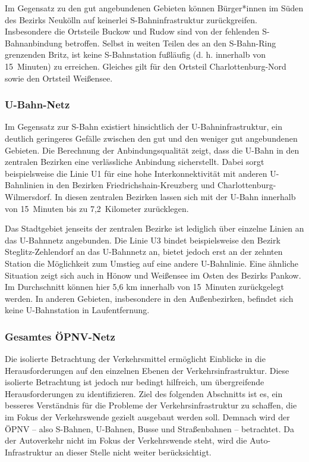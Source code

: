 
Im Gegensatz zu den gut angebundenen Gebieten können Bürger*innen im Süden des Bezirks Neukölln auf keinerlei S-Bahninfrastruktur zurückgreifen. Insbesondere die Ortsteile Buckow und Rudow sind von der fehlenden S-Bahnanbindung betroffen. Selbst in weiten Teilen des an den S-Bahn-Ring grenzenden Britz, ist keine S-Bahnstation fußläufig (d. h. innerhalb von 15~Minuten) zu erreichen. Gleiches gilt für den Ortsteil Charlottenburg-Nord sowie den Ortsteil Weißensee.

\subsubsection{U-Bahn-Netz}

Im Gegensatz zur S-Bahn existiert hinsichtlich der U-Bahninfrastruktur, ein deutlich geringeres Gefälle zwischen den gut und den weniger gut angebundenen Gebieten. Die Berechnung der Anbindungsqualität zeigt, dass die U-Bahn in den zentralen Bezirken eine verlässliche Anbindung sicherstellt. Dabei sorgt beispielsweise die Linie U1 für eine hohe Interkonnektivität mit anderen U-Bahnlinien in den Bezirken Friedrichshain-Kreuzberg und Charlottenburg-Wilmersdorf. In diesen zentralen Bezirken lassen sich mit der U-Bahn innerhalb von 15~Minuten bis zu 7,2~Kilometer zurücklegen.


Das Stadtgebiet jenseits der zentralen Bezirke ist lediglich über einzelne Linien an das U-Bahnnetz angebunden. Die Linie U3 bindet beispielsweise den Bezirk Steglitz-Zehlendorf an das U-Bahnnetz an, bietet jedoch erst an der zehnten Station die Möglichkeit zum Umstieg auf eine andere U-Bahnlinie. Eine ähnliche Situation zeigt sich auch in Hönow und Weißensee im Osten des Bezirks Pankow. Im Durchschnitt können hier 5,6 km innerhalb von 15~Minuten zurückgelegt werden. In anderen Gebieten, insbesondere in den Außenbezirken, befindet sich keine U-Bahnstation in Laufentfernung.

\subsubsection{Gesamtes ÖPNV-Netz}

Die isolierte Betrachtung der Verkehrsmittel ermöglicht Einblicke in die Herausforderungen auf den einzelnen Ebenen der Verkehrsinfrastruktur. Diese isolierte Betrachtung ist jedoch nur bedingt hilfreich, um übergreifende Herausforderungen zu identifizieren. Ziel des folgenden Abschnitts ist es, ein besseres Verständnis für die Probleme der Verkehrsinfrastruktur zu schaffen, die im Fokus der Verkehrswende gezielt ausgebaut werden soll. Demnach wird der ÖPNV – also S-Bahnen, U-Bahnen, Busse und Straßenbahnen – betrachtet. Da der Autoverkehr nicht im Fokus der Verkehrswende steht, wird die Auto-Infrastruktur an dieser Stelle nicht weiter berücksichtigt.

